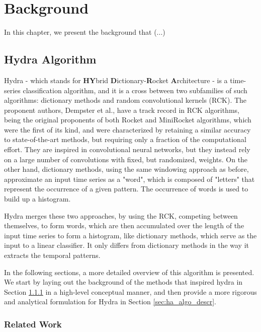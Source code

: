 \chapter{Background}
\label{ch:background}

In this chapter, we present the background that (...)

\section{Hydra Algorithm}
\label{sec:hydra_algo}
Hydra \cite{Dempster2023Hydra} - which stands for \textbf{HY}brid \textbf{D}ictionary-\textbf{R}ocket \textbf{A}rchitecture - is a time-series classification algorithm, and it is a cross between two subfamilies of such algorithms: dictionary methods and random convolutional kernels (RCK).
The proponent authors, Dempster et al., have a track record in RCK algorithms, being the original proponents of both Rocket \cite{Dempster2020} and MiniRocket \cite{Dempster2021MR} algorithms, which were the first of its kind,
and were characterized by retaining a similar accuracy to state-of-the-art methods, but requiring only a fraction of the computational effort. They are inspired in convolutional neural networks, but they instead rely on a large number of convolutions with fixed, but randomized, weights.
On the other hand, dictionary methods, using the same windowing approach as before, approximate an input time series as a "word", which is composed of "letters" that represent the occurrence of a given pattern. The occurrence of words is used to build up a histogram.

Hydra merges these two approaches, by using the RCK, competing between themselves, to form words, which are then accumulated over the length of the input time series to form a histogram, like dictionary methods, which serve as the input to a linear classifier. It only differs from dictionary methods
in the way it extracts the temporal patterns.

In the following sections, a more detailed overview of this algorithm is presented. We start by laying out the background of the methods that inspired hydra in Section \ref{sec:ha_related_work} in a high-level conceptual manner, and then provide a more rigorous and analytical formulation for Hydra in Section \ref{sec:ha_algo_descr}.

\subsection{Related Work}\label{sec:ha_related_work}

